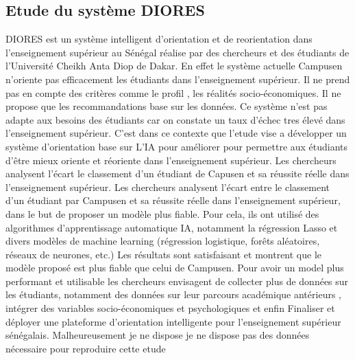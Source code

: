 \subsection{Etude du système DIORES} 
DIORES est un système intelligent d'orientation et de reorientation dans l'enseignement supérieur au Sénégal réalise par des chercheurs et des étudiants  de l'Université Cheikh Anta Diop de Dakar. 
En effet le système actuelle Campusen n'oriente pas efficacement les étudiants dans l'enseignement supérieur. Il ne prend pas en compte des critères comme le profil , les réalités socio-économiques. Il ne propose que les recommandations base sur les données. Ce système n'est pas adapte aux besoins des étudiants car on constate un taux d'échec tres élevé dans l'enseignement supérieur. 
C'est dans ce contexte que l'etude vise a développer un système d'orientation base sur L'IA pour améliorer pour permettre aux étudiants d'être mieux oriente et réoriente dans l'enseignement supérieur. 
Les chercheurs analysent l'écart le classement d'un étudiant de Capusen et sa réussite réelle dans l'enseignement supérieur. 
Les chercheurs analysent l'écart entre le classement d'un étudiant par Campusen et sa réussite réelle dans l'enseignement supérieur, dans le but de proposer un modèle plus fiable. Pour cela, ils ont utilisé  des algorithmes d'apprentissage automatique IA, notamment la régression Lasso et divers modèles de machine learning (régression logistique, forêts aléatoires, réseaux de neurones, etc.)  
Les résultats sont satisfaisant et montrent que le modèle proposé est plus fiable que celui de Campusen. 
Pour avoir un model plus performant et utilisable  les chercheurs envisagent de collecter plus de données sur les étudiants, notamment des données sur leur parcours académique antérieurs , intégrer des variables socio-économiques et psychologiques et enfin Finaliser et déployer une plateforme d'orientation intelligente pour l'enseignement supérieur sénégalais. 
Malheureusement je ne dispose je ne dispose pas des données nécessaire pour reproduire cette etude  

